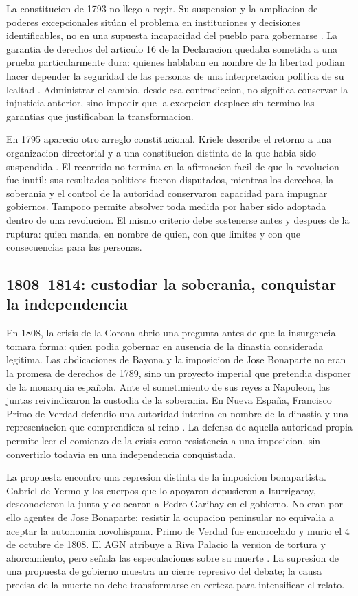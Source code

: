 \documentclass[spanish,letterpaper,oneside]{article}
\begin{document}
La constitucion de 1793 no llego a regir. Su suspension y la ampliacion
de poderes excepcionales sitúan el problema en instituciones y
decisiones identificables, no en una supuesta incapacidad del pueblo
para gobernarse \citep[pp.~282--283]{kriele2022}. La garantia de
derechos del articulo 16 de la Declaracion quedaba sometida a una
prueba particularmente dura: quienes hablaban en nombre de la libertad
podian hacer depender la seguridad de las personas de una interpretacion
politica de su lealtad \citep[arts.~7--9 y 16]{francia1789}.
Administrar el cambio, desde esa contradiccion, no significa conservar
la injusticia anterior, sino impedir que la excepcion desplace sin
termino las garantias que justificaban la transformacion.

En 1795 aparecio otro arreglo constitucional. Kriele describe el
retorno a una organizacion directorial y a una constitucion distinta
de la que habia sido suspendida \citep[sec.~72]{kriele2022}. El
recorrido no termina en la afirmacion facil de que la revolucion fue
inutil: sus resultados politicos fueron disputados, mientras los
derechos, la soberania y el control de la autoridad conservaron
capacidad para impugnar gobiernos. Tampoco permite absolver toda
medida por haber sido adoptada dentro de una revolucion. El mismo
criterio debe sostenerse antes y despues de la ruptura: quien manda,
en nombre de quien, con que limites y con que consecuencias para
las personas.

\subsection{1808--1814: custodiar la soberania, conquistar la independencia}

En 1808, la crisis de la Corona abrio una pregunta antes de que la
insurgencia tomara forma: quien podia gobernar en ausencia de la
dinastia considerada legitima. Las abdicaciones de Bayona y la
imposicion de Jose Bonaparte no eran la promesa de derechos de 1789,
sino un proyecto imperial que pretendia disponer de la monarquia
española. Ante el sometimiento de sus reyes a Napoleon, las juntas
reivindicaron la custodia de la soberania. En Nueva España, Francisco
Primo de Verdad defendio una autoridad interina en nombre de la
dinastia y una representacion que comprendiera al reino
\citep{agnPrimo2020}. La defensa de aquella autoridad propia permite
leer el comienzo de la crisis como resistencia a una imposicion,
sin convertirlo todavia en una independencia conquistada.

La propuesta encontro una represion distinta de la imposicion
bonapartista. Gabriel de Yermo y los cuerpos que lo apoyaron
depusieron a Iturrigaray, desconocieron la junta y colocaron a
Pedro Garibay en el gobierno. No eran por ello agentes de Jose
Bonaparte: resistir la ocupacion peninsular no equivalia a aceptar
la autonomia novohispana. Primo de Verdad fue encarcelado y murio
el 4 de octubre de 1808. El AGN atribuye a Riva Palacio la version
de tortura y ahorcamiento, pero señala las especulaciones sobre
su muerte \citep{agnPrimo2020}. La supresion de una propuesta de
gobierno muestra un cierre represivo del debate; la causa precisa
de la muerte no debe transformarse en certeza para intensificar
el relato.
\end{document}
